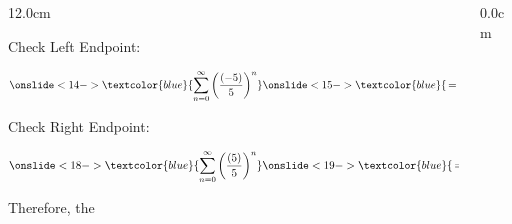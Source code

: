 \begin{frame}
\begin{columns}
\begin{column}{12.0cm}
\vspace{0.2cm}

Check Left Endpoint:  \\

\vspace{0.2cm}

$\displaystyle{\onslide<14->{\textcolor{blue}{\sum \limits_{n=0}^{\infty} \left(\frac{(-5)}{5}\right)^n}} \onslide<15->{\textcolor{blue}{\,= \sum \limits_{n=0}^{\infty} \left(-1\right)^n}}}$ \quad 
{}

\vspace{0.3cm}

Check Right Endpoint:  \\

\vspace{0.2cm}

$\displaystyle{\onslide<18->{\textcolor{blue}{\sum \limits_{n=0}^{\infty} \left(\frac{(5)}{5}\right)^n}} \onslide<19->{\textcolor{blue}{\,= \sum \limits_{n=0}^{\infty} \left(1\right)^n}}}$ \quad 
{}

\vspace{0.3cm}

Therefore, the 
\vspace{10.5cm}

\end{column}
\begin{column}{0.0cm}
	
\end{column}
\end{columns}
\end{frame}

